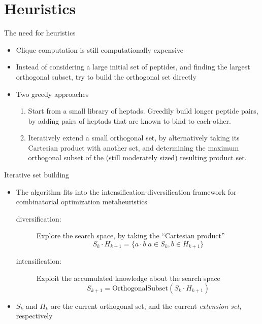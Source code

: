 \documentclass{beamer}
\theoremstyle{plain}
\theoremstyle{remark}
\begin{document}
\section{Heuristics}
\begin{frame}{The need for heuristics}
	\begin{itemize}
		\item Clique computation is still computationally expensive
		\item Instead of considering a large initial set of peptides, and finding the largest orthogonal subset, try to build the orthogonal set directly
		\item Two greedy approaches
		\begin{enumerate}
			\item Start from a small library of heptads. Greedily build longer peptide pairs, by adding pairs of heptads that are known to bind to each-other.
			\item \alert<2>{Iteratively extend a small orthogonal set, by alternatively taking its Cartesian
			product with another set, and determining the maximum orthogonal subset of the
			(still moderately sized) resulting product set.}
		\end{enumerate}
	\end{itemize}
\end{frame}

\begin{frame}{Iterative set building}
\begin{itemize}
	\item The algorithm fits into the intensification-diversification framework for combinatorial optimization metaheuristics
	\begin{description}
		\item[diversification:] Explore the search space, by taking the ``Cartesian product''
		\[ S_k \cdot H_{k+1} = \{ a\cdot b | a \in S_k, b \in H_{k+1} \} \]
		\item[intensification:] Exploit the accumulated knowledge about the search space
		\[ S_{k+1} = \mathrm{OrthogonalSubset}(S_k \cdot H_{k+1}) \]
	\end{description}
	\item $S_k$ and $H_k$ are the current orthogonal set, and the current \emph{extension set}, respectively 
\end{itemize}
\end{frame}
\end{document}

